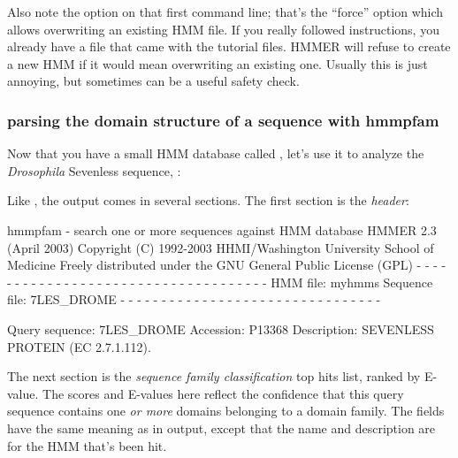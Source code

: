 Also note the  option on that first  command
line; that's the ``force'' option which allows overwriting an existing
HMM file. If you really followed instructions, you already have a file
 that came with the tutorial files. HMMER will refuse to
create a new HMM if it would mean overwriting an existing one. Usually
this is just annoying, but sometimes can be a useful safety check.

\subsubsection{parsing the domain structure of a sequence with hmmpfam}

Now that you have a small HMM database called , let's use
it to analyze the \emph{Drosophila} Sevenless sequence,
:


Like , the  output comes in several
sections. The first section is the \emph{ header}:

\begin{sreoutput}
hmmpfam - search one or more sequences against HMM database
HMMER 2.3 (April 2003)
Copyright (C) 1992-2003 HHMI/Washington University School of Medicine
Freely distributed under the GNU General Public License (GPL)
- - - - - - - - - - - - - - - - - - - - - - - - - - - - - - - - - - - -
HMM file:                 myhmms
Sequence file:            7LES_DROME
- - - - - - - - - - - - - - - - - - - - - - - - - - - - - - - -

Query sequence: 7LES_DROME
Accession:      P13368
Description:    SEVENLESS PROTEIN (EC 2.7.1.112).
\end{sreoutput}

The next section is the \emph{ sequence family classification} top hits
list, ranked by E-value. The scores and E-values here reflect the
confidence that this query sequence contains one \emph{or more} domains
belonging to a domain family. The fields have the same meaning as in
 output, except that the name and description are for
the HMM that's been hit.

